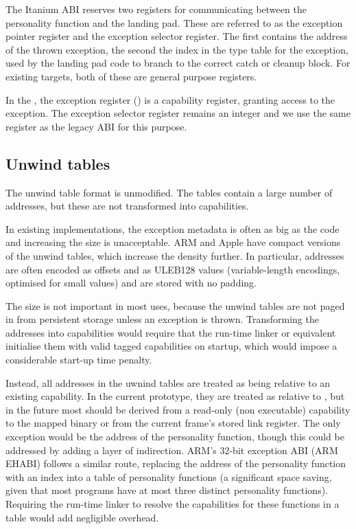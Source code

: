 The Itanium ABI reserves two registers for communicating between the personality function and the landing pad.
These are referred to as the exception pointer register and the exception selector register.
The first contains the address of the thrown exception, the second the index in the type table for the exception, used by the landing pad code to branch to the correct catch or cleanup block.
For existing targets, both of these are general purpose registers.

In the \sandboxABI{}, the exception register () is a capability register, granting access to the exception.
The exception selector register remains an integer and we use the same register as the legacy ABI for this purpose.

\subsection{Unwind tables}

The unwind table format is unmodified.
The tables contain a large number of addresses, but these are not transformed into capabilities.

In existing implementations, the exception metadata is often as big as the code and increasing the size is unacceptable.
ARM and Apple have compact versions of the unwind tables, which increase the density further.
In particular, addresses are often encoded as offsets and as ULEB128 values (variable-length encodings, optimised for small values) and are stored with no padding.

The size is not important in most uses, because the unwind tables are not paged in from persistent storage unless an exception is thrown.
Transforming the addresses into capabilities would require that the run-time linker or equivalent initialise them with valid tagged capabilities on startup, which would impose a considerable start-up time penalty.

Instead, all addresses in the uwnind tables are treated as being relative to an existing capability.
In the current prototype, they are treated as relative to , but in the future most should be derived from a read-only (non executable) capability to the mapped binary or from the current frame's stored link register.
The only exception would be the address of the personality function, though this could be addressed by adding a layer of indirection.
ARM's 32-bit exception ABI (ARM EHABI) follows a similar route, replacing the address of the personality function with an index into a table of personality functions (a significant space saving, given that most programs have at most three distinct personality functions).
Requiring the run-time linker to resolve the capabilities for these functions in a table would add negligible overhead.
